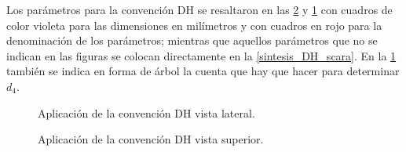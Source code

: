 \documentclass[a4paper,12pt]{article}
\begin{document}
Los parámetros para la convención DH se resaltaron en las \cref{DH_superior} y \cref{DH_lateral}
con cuadros de color violeta para las dimensiones en milímetros y con cuadros en rojo
para la denominación de los parámetros; mientras que aquellos parámetros que no se indican en las figuras
se colocan directamente en la \cref{sintesis_DH_scara}. En la \cref{DH_lateral} también se indica en forma
de árbol la cuenta que hay que hacer para determinar $d_4$.

\begin{figure}[H]
    \centering
    \begin{adjustbox}{scale = 0.66, max width=\columnwidth}
    \end{adjustbox}
    \caption{Aplicación de la convención DH vista lateral.}
    \label{DH_lateral}
\end{figure}

\begin{figure}[H]
    \centering
    \begin{adjustbox}{scale = 0.66, max width=\columnwidth}
    \end{adjustbox}
    \caption{Aplicación de la convención DH vista superior.}
    \label{DH_superior}
\end{figure}
\end{document}
